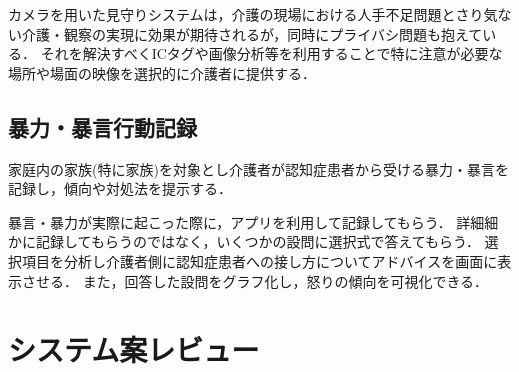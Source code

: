 \documentclass[../report]{subfiles}
\begin{document}
カメラを用いた見守りシステムは，介護の現場における人手不足問題とさり気ない介護・観察の実現に効果が期待されるが，同時にプライバシ問題も抱えている．
それを解決すべくICタグや画像分析等を利用することで特に注意が必要な場所や場面の映像を選択的に介護者に提供する．

\subsection{暴力・暴言行動記録}
家庭内の家族(特に家族)を対象とし介護者が認知症患者から受ける暴力・暴言を記録し，傾向や対処法を提示する．

暴言・暴力が実際に起こった際に，アプリを利用して記録してもらう．
詳細細かに記録してもらうのではなく，いくつかの設問に選択式で答えてもらう．
選択項目を分析し介護者側に認知症患者への接し方についてアドバイスを画面に表示させる．
また，回答した設問をグラフ化し，怒りの傾向を可視化できる．


\section{システム案レビュー}
\end{document}

